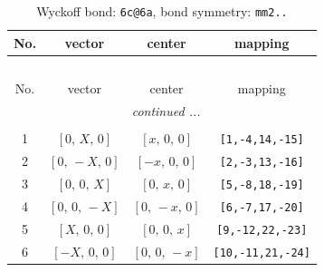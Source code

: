 \documentclass[fleqn,8pt]{jsarticle}
\begin{document}
\begin{longtable}{cccc}
\caption{Wyckoff bond: {\tt 6c@6a}, bond symmetry: {\tt mm2..}}
 \\
 \hline \hline
No. & vector & center & mapping \\ \hline \endfirsthead

\multicolumn{3}{l}{\tablename\ \thetable{}} \\
 \hline \hline
No. & vector & center & mapping \\ \hline \endhead

 \hline \hline
\multicolumn{3}{r}{\footnotesize\it continued ...} \\ \endfoot

 \hline \hline
\multicolumn{3}{r}{} \\ \endlastfoot

1 & $\left[ 0,\, X,\, 0 \right]$ & $\left[ x,\, 0,\, 0 \right]$ & {\tt [1,-4,14,-15]} \\ \hline
2 & $\left[ 0,\, - X,\, 0 \right]$ & $\left[ - x,\, 0,\, 0 \right]$ & {\tt [2,-3,13,-16]} \\ \hline
3 & $\left[ 0,\, 0,\, X \right]$ & $\left[ 0,\, x,\, 0 \right]$ & {\tt [5,-8,18,-19]} \\ \hline
4 & $\left[ 0,\, 0,\, - X \right]$ & $\left[ 0,\, - x,\, 0 \right]$ & {\tt [6,-7,17,-20]} \\ \hline
5 & $\left[ X,\, 0,\, 0 \right]$ & $\left[ 0,\, 0,\, x \right]$ & {\tt [9,-12,22,-23]} \\ \hline
6 & $\left[ - X,\, 0,\, 0 \right]$ & $\left[ 0,\, 0,\, - x \right]$ & {\tt [10,-11,21,-24]} \\
\end{longtable}
\renewcommand{\arraystretch}{1.2}
\end{document}
